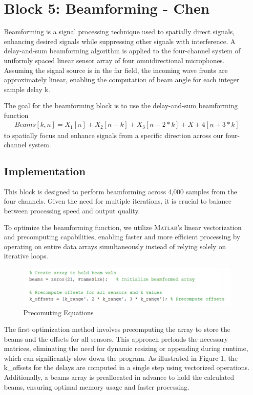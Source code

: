 
\section{Block 5: Beamforming - Chen}

Beamforming is a signal processing technique used to spatially direct signals, enhancing desired signals while suppressing other signals with interference. A delay-and-sum beamforming algorithm is applied to the four-channel system of uniformly spaced linear sensor array of four omnidirectional microphones. Assuming the signal source is in the far field, the incoming wave fronts are approximately linear, enabling the computation of beam angle for each integer sample delay k.

The goal for the beamforming block is to use the delay-and-sum beamforming function 
\begin{align*}
    Beams[k,n] = X_1[n]+X_2[n+k]+X_3[n+2*k]+X+4[n+3*k]
\end{align*}
to spatially focus and enhance signals from a specific direction across our four-channel system.


\subsection{Implementation}

This block is designed to perform beamforming across 4,000 samples from the four channels. Given the need for multiple iterations, it is crucial to balance between processing speed and output quality.

To optimize the beamforming function, we utilize \textsc{Matlab}'s linear vectorization and precomputing capabilities, enabling faster and more efficient processing by operating on entire data arrays simultaneously instead of relying solely on iterative loops.

\begin{figure}[H]
    \centering
    \includegraphics[width=0.5\linewidth]{figures/beamform_fig1.png}
    \caption{Precomuting Equations}
    \label{fig:precomputing_equations}
\end{figure}

The first optimization method involves precomputing the array to store the beams and the offsets for all sensors. This approach preloads the necessary matrices, eliminating the need for dynamic resizing or appending during runtime, which can significantly slow down the program. As illustrated in Figure 1, the k\_offsets for the delays are computed in a single step using vectorized operations. Additionally, a beams array is preallocated in advance to hold the calculated beams, ensuring optimal memory usage and faster processing.

